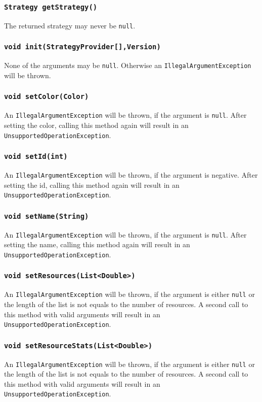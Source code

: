 \documentclass{article}
\begin{document}
\subsubsection{\texttt{Strategy getStrategy()}}
The returned strategy may never be \texttt{null}.

\subsubsection{\texttt{void init(StrategyProvider[],Version)}}
None of the arguments may be \texttt{null}. Otherwise an \texttt{IllegalArgumentException} will be thrown.

\subsubsection{\texttt{void setColor(Color)}}
An \texttt{IllegalArgumentException} will be thrown, if the argument is \texttt{null}.
After setting the color, calling this method again will result in an \texttt{UnsupportedOperationException}.

\subsubsection{\texttt{void setId(int)}}
An \texttt{IllegalArgumentException} will be thrown, if the argument is negative.
After setting the id, calling this method again will result in an \texttt{UnsupportedOperationException}.

\subsubsection{\texttt{void setName(String)}}
An \texttt{IllegalArgumentException} will be thrown, if the argument is \texttt{null}.
After setting the name, calling this method again will result in an \texttt{UnsupportedOperationException}.

\subsubsection{\texttt{void setResources(List<Double>)}}
An \texttt{IllegalArgumentException} will be thrown, if the argument is either \texttt{null}
or the length of the list is not equals to the number of resources.
A second call to this method with valid arguments will result in an \texttt{UnsupportedOperationException}.

\subsubsection{\texttt{void setResourceStats(List<Double>)}}
An \texttt{IllegalArgumentException} will be thrown, if the argument is either \texttt{null}
or the length of the list is not equals to the number of resources.
A second call to this method with valid arguments will result in an \texttt{UnsupportedOperationException}.
\end{document}
